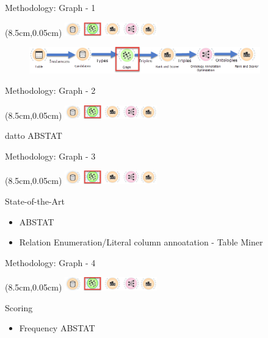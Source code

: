 \documentclass{beamer}
\begin{document}
\begin{frame}{Methodology: Graph - 1}
	\begin{textblock*}{4cm}(8.5cm,0.05cm) %
		\includegraphics[width=4cm]{images/header-graph.png}
	\end{textblock*}
	\begin{figure}
		\includegraphics[width=10cm]{images/diagrams-graph.png}
	\end{figure}
\end{frame}
\begin{frame}{Methodology: Graph - 2}
	\begin{textblock*}{4cm}(8.5cm,0.05cm) %
		\includegraphics[width=4cm]{images/header-graph.png}
	\end{textblock*}
	\begin{definition}
		datto ABSTAT
	\end{definition}
\end{frame}
\begin{frame}{Methodology: Graph - 3}
	\begin{textblock*}{4cm}(8.5cm,0.05cm) %
		\includegraphics[width=4cm]{images/header-graph.png}
	\end{textblock*}
	State-of-the-Art
	\begin{itemize}
		\item ABSTAT
		\item Relation Enumeration/Literal column annoatation - Table Miner
	\end{itemize}
\end{frame}
\begin{frame}{Methodology: Graph - 4}
	\begin{textblock*}{4cm}(8.5cm,0.05cm) %
		\includegraphics[width=4cm]{images/header-graph.png}
	\end{textblock*}
	Scoring
	\begin{itemize}
		\item Frequency ABSTAT
	\end{itemize}
\end{frame}
\end{document}
